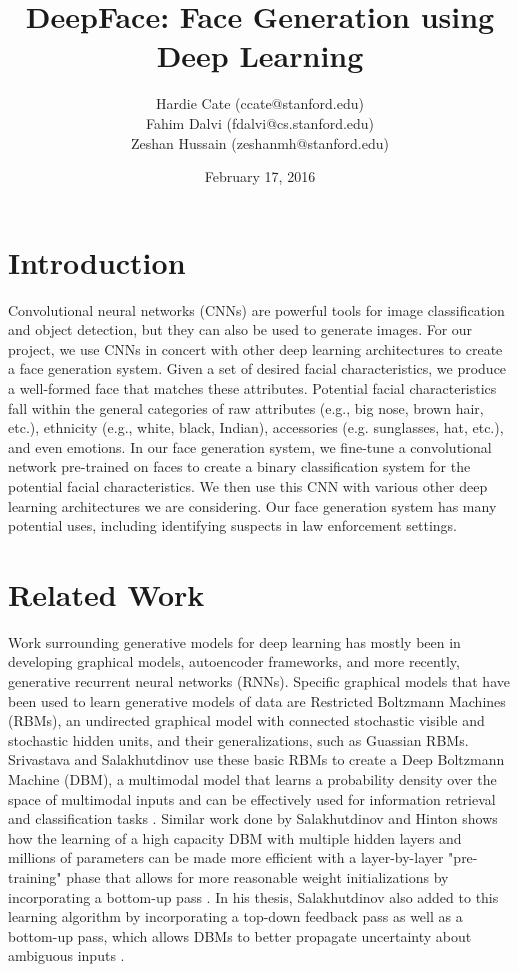\documentclass[twocolumn]{article}
\title{DeepFace: Face Generation using Deep Learning}
\author{Hardie Cate (ccate@stanford.edu)\\ Fahim Dalvi (fdalvi@cs.stanford.edu) \\ Zeshan Hussain (zeshanmh@stanford.edu)}
\date{February 17, 2016}
\begin{document}
\maketitle

\section{Introduction}
Convolutional neural networks (CNNs) are powerful tools for image classification and object detection, but they can also be used to generate images. For our project, we use CNNs in concert with other deep learning architectures to create a face generation system. Given a set of desired facial characteristics, we produce a well-formed face that matches these attributes. Potential facial characteristics fall within the general categories of raw attributes (e.g., big nose, brown hair, etc.), ethnicity (e.g., white, black, Indian), accessories (e.g. sunglasses, hat, etc.), and even emotions. In our face generation system, we fine-tune a convolutional network pre-trained on faces to create a binary classification system for the potential facial characteristics. We then use this CNN with various other deep learning architectures we are considering. Our face generation system has many potential uses, including identifying suspects in law enforcement settings.

\section{Related Work}
Work surrounding generative models for deep learning has mostly been in developing graphical models, autoencoder frameworks, and more recently, generative recurrent neural networks (RNNs). Specific graphical models that have been used to learn generative models of data are Restricted Boltzmann Machines (RBMs), an undirected graphical model with connected stochastic visible and stochastic hidden units, and their generalizations, such as Guassian RBMs. Srivastava and Salakhutdinov use these basic RBMs to create a Deep Boltzmann Machine (DBM), a multimodal model that learns a probability density over the space of multimodal inputs and can be effectively used for information retrieval and classification tasks \cite{NIPS2012_4683}. Similar work done by Salakhutdinov and Hinton shows how the learning of a high capacity DBM with multiple hidden layers and millions of parameters can be made more efficient with a layer-by-layer "pre-training" phase that allows for more reasonable weight initializations by incorporating a bottom-up pass \cite{salakhutdinov2009deep}. In his thesis, Salakhutdinov also added to this learning algorithm by incorporating a top-down feedback pass as well as a bottom-up pass, which allows DBMs to better propagate uncertainty about ambiguous inputs \cite{salakhutdinov2009learning}.
\end{document}
